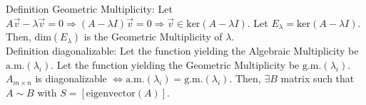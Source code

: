 \documentclass[11pt]{article}
\begin{document}
\noindent
Definition Geometric Multiplicity: Let $A\vec{v}-\lambda\vec{v}=0\Rightarrow(A-\lambda I)\vec{v}=0\Rightarrow \vec{v}\in\text{ker}(A-\lambda I)$. Let $E_\lambda =\text{ker}(A-\lambda I)$. Then, $\text{dim}(E_\lambda)$ is the Geometric Multiplicity of $\lambda$.\\

\noindent
Definition diagonalizable: Let the function yielding the Algebraic Multiplicity be $\text{a.m.}(\lambda_i)$. Let the function yielding the Geometric Multiplicity be $\text{g.m.}(\lambda_i)$. $A_{m\times n}$ is diagonalizable $\Leftrightarrow \text{a.m.}(\lambda_i)=\text{g.m.}(\lambda_i)$. Then, $\exists B$ matrix such that $A\sim B$ with $S=[\text{eigenvector}(A)]$.
\end{document}
